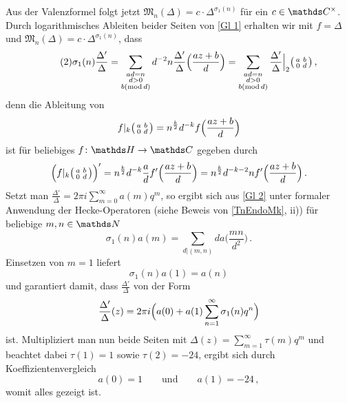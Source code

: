 \begin{bewe}
Aus der Valenzformel folgt jetzt $\mathfrak{M}_n(\Delta) = c \cdot \Delta^{\sigma_1(n)}$ für ein $c \in \CC^\times$. Durch logarithmisches Ableiten beider Seiten von \autoref{Gl 1} erhalten wir mit $f  = \Delta$ und $\mathfrak{M}_n(\Delta) = c \cdot \Delta^{\sigma_1(n)}$, dass
\[
\label{Gl 2}\tag{2}
\sigma_1(n) \frac {\Delta'}{\Delta} = \sum_{\substack{ad = n\\ d > 0\\ b (\operatorname{mod} d)}} d^{-2}n \frac{\Delta'}{\Delta} \Bigl( \frac{az+b}{d} \Bigr) = \sum_{\substack{ad = n\\ d > 0\\ b (\operatorname{mod} d)}} \frac{\Delta'}{\Delta} \Big|_2 \mymat{a}{b}{0}{d}
\,,
\]
denn die Ableitung von
\[
f |_k \mymat{a}{b}{0}{d} = n^{\frac k2} d^{-k} f\Bigl( \frac{az+b}{d} \Bigr)
\]
ist für beliebiges $f \colon \HH \to \CC$ gegeben durch
\[
\Bigl(f |_k \mymat{a}{b}{0}{d}\Bigr)' = n^{\frac k2} d^{-k} \frac ad f' \Bigl( \frac{az+b}{d} \Bigr) = n^{\frac k2} d^{-k-2} n f'\Bigl( \frac{az+b}{d} \Bigr)
\,.
\]
Setzt man $\frac{\Delta'}{\Delta} = 2\pi i \sum_{m=0}^\infty a(m) q^m$, so ergibt sich aus \autoref{Gl 2} unter formaler Anwendung der Hecke-Operatoren (siehe Beweis von \autoref{TnEndoMk}, ii)) für beliebige $m,n \in \NN$
\[
\sigma_1(n) a(m) = \sum_{d\vert(m,n)} d a\bigl( \frac{mn}{d^2} \bigr)
\,.
\]
Einsetzen von $m = 1$ liefert
\[
\sigma_1(n) a(1) = a(n)
\]
und garantiert damit, dass $\frac{\Delta'}{\Delta}$ von der Form
\[
\frac{\Delta'}{\Delta}(z) = 2\pi i \Bigl( a(0) + a(1) \sum_{n=1}^\infty \sigma_1(n) q^n \Bigr)
\]
ist. Multipliziert man nun beide Seiten mit $\Delta(z) = \sum_{m=1}^\infty \tau(m) q^m$ und beachtet dabei $\tau(1) = 1$ sowie $\tau(2) = -24$, ergibt sich durch Koeffizientenvergleich
\[
a(0) = 1 \qquad \text{und} \qquad a(1) = -24
\,,
\]
womit alles gezeigt ist.
\end{bewe}




